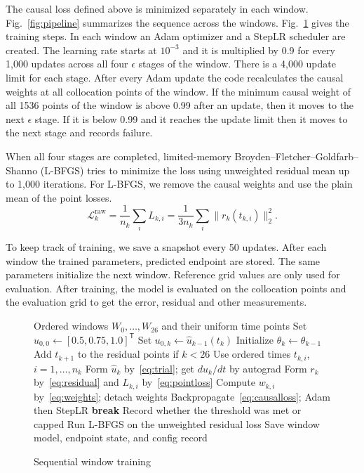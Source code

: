 \documentclass[conference,a4paper]{IEEEtran}
\begin{document}
The causal loss defined above is minimized separately in each window. Fig.~\ref{fig:pipeline} summarizes the sequence across the windows. Fig.~\ref{fig:training} gives the training steps. In each window an Adam optimizer and a StepLR scheduler are created. The learning rate starts at $10^{-3}$ and it is multiplied by 0.9 for every 1,000 updates across all four $\epsilon$ stages of the window. There is a 4,000 update limit for each stage. After every Adam update the code recalculates the causal weights at all collocation points of the window. If the minimum causal weight of all 1536 points of the window is above 0.99 after an update, then it moves to the next $\epsilon$ stage. If it is below 0.99 and it reaches the update limit then it moves to the next stage and records failure.

When all four stages are completed, limited-memory Broyden–Fletcher–Goldfarb–Shanno (L-BFGS) tries to minimize the loss using unweighted residual mean up to 1,000 iterations. For L-BFGS, we remove the causal weights and use the plain mean of the point losses.
\[
\mathcal{L}^{\mathrm{raw}}_k
=\frac{1}{n_k}\sum_i L_{k,i}
=\frac{1}{3n_k}\sum_i\|r_k(t_{k,i})\|_2^2.
\]

To keep track of training, we save a snapshot every 50 updates. After each window the trained parameters, predicted endpoint are stored. The same parameters initialize the next window. Reference grid values are only used for evaluation. After training, the model is evaluated on the collocation points and the evaluation grid to get the error, residual and other measurements. 

\begin{figure}[t]
\centering
\begin{minipage}{\columnwidth}
\begin{algorithmic}[1]
\Require Ordered windows $W_0,\ldots,W_{26}$ and their uniform time points
\State Set $u_{0,0}\gets[0.5,0.75,1.0]^\mathsf{T}$
    \State Set $u_{0,k}\gets\hat{u}_{k-1}(t_k)$
    \State Initialize $\theta_k\gets\theta_{k-1}$
  \EndIf
  \State Add $t_{k+1}$ to the residual points if $k<26$
      \State Use ordered times $t_{k,i}$, $i=1,\ldots,n_k$
    \State Form $\hat{u}_k$ by~\eqref{eq:trial}; get $d\hat{u}_k/dt$ by autograd
    \State Form $r_k$ by~\eqref{eq:residual} and $L_{k,i}$ by~\eqref{eq:pointloss}
    \State Compute $w_{k,i}$ by~\eqref{eq:weights}; detach weights
      \State Backpropagate~\eqref{eq:causalloss}; Adam then StepLR
        \State \textbf{break}
      \EndIf
    \EndFor
    \State Record whether the threshold was met or capped
  \EndFor
  \State Run L-BFGS on the unweighted residual loss
  \State Save window model, endpoint state, and config record
\EndFor
\end{algorithmic}
\end{minipage}
\caption{Sequential window training}
\label{fig:training}
\end{figure}
\end{document}
